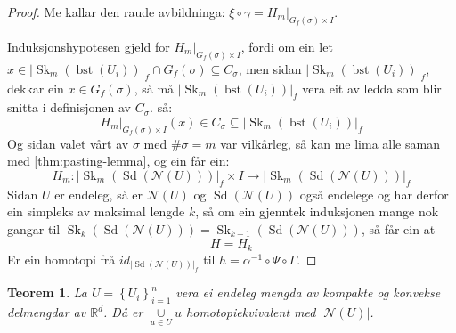 \documentclass[a4paper, 12pt, norsk]{article}
\theoremstyle{plain}
\newtheorem{theorem}{Teorem}[section]
\newtheorem{lemma}[theorem]{Lemma}
\theoremstyle{definition}
\newcommand{\Rb}{\mathbb{R}}
\newcommand{\Nc}{\mathcal{N}}
\newcommand{\intersect}{ \mathop{\cap}\limits } %
\newcommand{\union}{ \mathop{\cup}\limits }
\newcommand{\gr}[1]{ \lvert #1 \rvert } %
\newcommand{\set}[1]{ \left \{ #1 \right \} } %
\newcommand{\tuple}[1]{ \left( #1 \right) } %
\DeclareMathOperator{\Sd}{Sd}
\DeclareMathOperator{\bst}{bst}
\DeclareMathOperator{\Sk}{Sk}
\begin{document}
\begin{proof}
	Me kallar den raude avbildninga: \( \xi \circ \gamma = H_m|_{G_f(\sigma) \times I} \).


	Induksjonshypotesen gjeld for \( H_m|_{G_f(\sigma) \times I} \), fordi om ein let \( x \in \gr{\Sk_m(\bst(U_i))}_f \intersect G_f(\sigma) \subseteq C_\sigma \), men sidan \( \gr{\Sk_m(\bst(U_i))}_f \), dekkar ein \( x \in G_f(\sigma) \), så må \( \gr{\Sk_m(\bst(U_i))}_f \) vera eit av ledda som blir snitta i definisjonen av \( C_\sigma \). så:
	\[
		H_m|_{G_f(\sigma) \times I}(x) \in C_\sigma \subseteq \gr{\Sk_m(\bst(U_i))}_f
	\]
	Og sidan valet vårt av \( \sigma \) med \( \#\sigma = m \) var vilkårleg, så kan me lima alle saman med \autoref{thm:pasting-lemma}, og ein får ein:
	\[
		H_m : \gr{\Sk_m(\Sd(\Nc(U)))}_f \times I \to \gr{\Sk_m(\Sd(\Nc(U)))}_f
	\]
	Sidan \( U \) er endeleg, så er \( \Nc(U) \) og \( \Sd(\Nc(U)) \) også endelege og har derfor ein simpleks av maksimal lengde \( k \), så om ein gjenntek induksjonen mange nok gangar til \( \Sk_{k}(\Sd(\Nc(U))) = \Sk_{k+1}(\Sd(\Nc(U))) \), så får ein at
	\[
		H = H_k
	\]
	Er ein homotopi frå \( id_{\gr{\Sd(\Nc(U))}_f} \) til \( h = \alpha^{-1} \circ \Psi \circ \Gamma \).

\end{proof}



\begin{theorem} %
	La \( U = \set{U_i}_{i=1}^n \) vera ei endeleg mengda av kompakte og konvekse delmengdar av \( \Rb^d \). Då er \( \union_{u \in U} u \) homotopiekvivalent med \( \gr{\Nc(U)} \).
\end{theorem}
\end{document}
